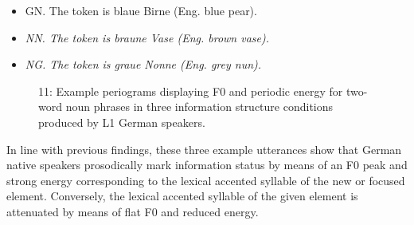 \begin{itemize}
\item \begin{stylecaption}
GN. The token is blaue Birne (Eng. blue pear).
\end{stylecaption}
\end{itemize}
\begin{stylecaption}
  
 
\end{stylecaption}

\begin{itemize}
\item \begin{styleListParagraph}
\textit{NN. The token is braune Vase (Eng. brown vase).}
\end{styleListParagraph}
\end{itemize}

  
 

\begin{itemize}
\item \begin{styleListParagraph}
\textit{NG. The token is graue Nonne (Eng. grey nun).}
\end{styleListParagraph}
\end{itemize}
\begin{stylecaption}\begin{figure}
\caption{11: Example periograms displaying F0 and periodic energy for two-word noun phrases in three information structure conditions produced by L1 German speakers.}
\label{fig:key:2}
\end{figure}\end{stylecaption}

In line with previous findings, these three example utterances show that German native speakers prosodically mark information status by means of an F0 peak and strong energy corresponding to the lexical accented syllable of the new or focused element. Conversely, the lexical accented syllable of the given element is attenuated by means of flat F0 and reduced energy.

